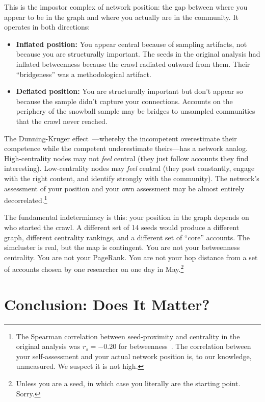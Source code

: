 \documentclass[11pt,a4paper]{article}
\begin{document}
This is the impostor complex of network position: the gap between where you appear to be in the graph and where you actually are in the community. It operates in both directions:

\begin{itemize}[leftmargin=*]
    \item \textbf{Inflated position:} You appear central because of sampling artifacts, not because you are structurally important. The seeds in the original analysis had inflated betweenness because the crawl radiated outward from them. Their ``bridgeness'' was a methodological artifact.
    \item \textbf{Deflated position:} You are structurally important but don't appear so because the sample didn't capture your connections. Accounts on the periphery of the snowball sample may be bridges to unsampled communities that the crawl never reached.
\end{itemize}

The Dunning-Kruger effect~\cite{kruger1999}---whereby the incompetent overestimate their competence while the competent underestimate theirs---has a network analog. High-centrality nodes may not \textit{feel} central (they just follow accounts they find interesting). Low-centrality nodes may \textit{feel} central (they post constantly, engage with the right content, and identify strongly with the community). The network's assessment of your position and your own assessment may be almost entirely decorrelated.\footnote{The Spearman correlation between seed-proximity and centrality in the original analysis was $r_s = -0.20$ for betweenness~\cite{simcluster-paper}. The correlation between your self-assessment and your actual network position is, to our knowledge, unmeasured. We suspect it is not high.}

The fundamental indeterminacy is this: your position in the graph depends on who started the crawl. A different set of 14 seeds would produce a different graph, different centrality rankings, and a different set of ``core'' accounts. The simcluster is real, but the map is contingent. You are not your betweenness centrality. You are not your PageRank. You are not your hop distance from a set of accounts chosen by one researcher on one day in May.\footnote{Unless you are a seed, in which case you literally are the starting point. Sorry.}

\section{Conclusion: Does It Matter?}
\end{document}
